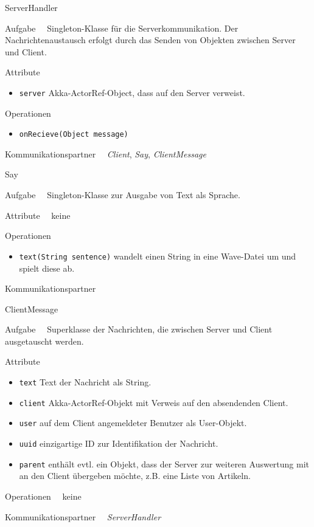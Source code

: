 \begin{class}{10}{ServerHandler}
\item[Aufgabe]~\
Singleton-Klasse für die Serverkommunikation. Der Nachrichtenaustausch erfolgt
durch das Senden von Objekten zwischen Server und Client.
\item[Attribute]~\
\begin{itemize}
    \item \texttt{server} Akka-ActorRef-Object, dass auf den Server verweist.
\end{itemize}
\item[Operationen]~\
\begin{itemize}
    \item \texttt{onRecieve(Object message)}
\end{itemize}
\item[Kommunikationspartner]~\
\textit{Client}, \textit{Say}, \textit{ClientMessage}
\end{class}

\begin{class}{10}{Say}
\item[Aufgabe]~\
Singleton-Klasse zur Ausgabe von Text als Sprache.
\item[Attribute]~\
keine
\item[Operationen]~\
\begin{itemize}
    \item \texttt{text(String sentence)} wandelt einen String in eine Wave-Datei
    um und spielt diese ab.
\end{itemize}
\item[Kommunikationspartner]~\

\end{class}

\begin{class}{10}{ClientMessage}
\item[Aufgabe]~\
Superklasse der Nachrichten, die zwischen Server und Client ausgetauscht werden.
\item[Attribute]~\
\begin{itemize}
    \item \texttt{text} Text der Nachricht als String.
    \item \texttt{client} Akka-ActorRef-Objekt mit Verweis auf den absendenden
    Client.
    \item \texttt{user} auf dem Client angemeldeter Benutzer als User-Objekt.
    \item \texttt{uuid} einzigartige ID zur Identifikation der Nachricht.
    \item \texttt{parent} enthält evtl. ein Objekt, dass der Server zur weiteren
    Auswertung mit an den Client übergeben möchte, z.B. eine Liste von Artikeln.
\end{itemize}
\item[Operationen]~\
keine
\item[Kommunikationspartner]~\
\textit{ServerHandler}
\end{class}

